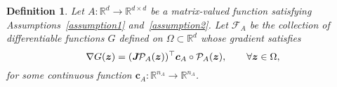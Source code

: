 \documentclass[openacc]{rsproca_new}%
\newcommand{\z}{\bm{z}}
\newtheorem{remark}{Remark}
\newtheorem{definition}{Definition}
\begin{document}
\begin{definition}
    Let $A:\mathbb{R}^d \to \mathbb{R}^{d\times d}$ be a matrix-valued function
    satisfying Assumptions~\ref{assumption1} and~\ref{assumption2}.
    Let $\mathcal{F}_A$
    be the collection of differentiable functions $G$ defined on $\Omega \subset \mathbb{R}^d$ 
    whose gradient satisfies 
    \begin{equation} \label{def:F_A}
    \nabla G(\z) =
    (\emph{\textbf{J}}\mathcal{P}_A(\z))^\top \bm{c}_A \circ \mathcal{P}_A(\z),
    \qquad \forall \z \in \Omega,
    \end{equation}
    for some continuous function $\bm{c}_A:\mathbb{R}^{n_A} \to \mathbb{R}^{n_A}$.
\end{definition}

\end{document}
